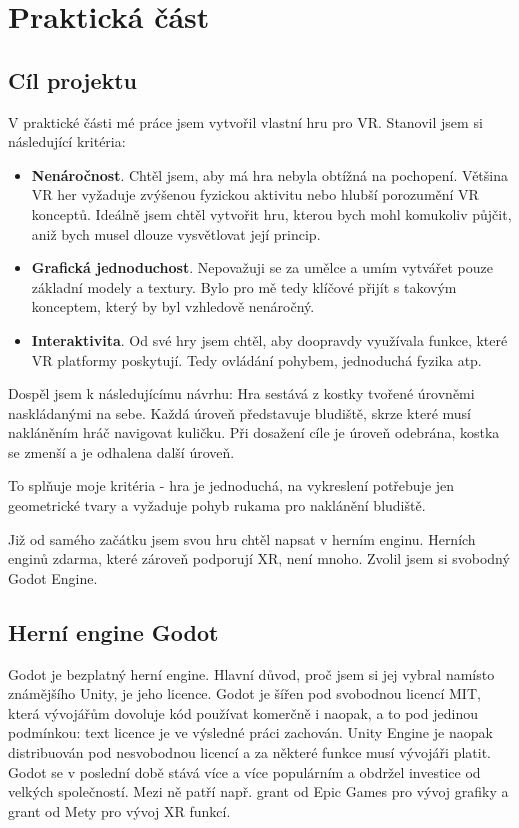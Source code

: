 \part{Praktická část}

\chapter{Cíl projektu}

V praktické části mé práce jsem vytvořil vlastní hru pro VR. Stanovil jsem si následující kritéria:

\begin{itemize}
  \item \textbf{Nenáročnost}. Chtěl jsem, aby má hra nebyla obtížná na pochopení. Většina VR her vyžaduje zvýšenou fyzickou aktivitu nebo hlubší porozumění VR konceptů. Ideálně jsem chtěl vytvořit hru, kterou bych mohl komukoliv půjčit, aniž bych musel dlouze vysvětlovat její princip.
  \item \textbf{Grafická jednoduchost}. Nepovažuji se za umělce a umím vytvářet pouze základní modely a textury. Bylo pro mě tedy klíčové přijít s takovým konceptem, který by byl vzhledově nenáročný.
  \item \textbf{Interaktivita}. Od své hry jsem chtěl, aby doopravdy využívala funkce, které VR platformy poskytují. Tedy ovládání pohybem, jednoduchá fyzika atp.
\end{itemize}

Dospěl jsem k následujícímu návrhu: Hra sestává z kostky tvořené úrovněmi naskládanými na sebe. Každá úroveň představuje bludiště, skrze které musí nakláněním hráč navigovat kuličku. Při dosažení cíle je úroveň odebrána, kostka se zmenší a je odhalena další úroveň.

To splňuje moje kritéria - hra je jednoduchá, na vykreslení potřebuje jen geometrické tvary a vyžaduje pohyb rukama pro naklánění bludiště.

Již od samého začátku jsem svou hru chtěl napsat v herním enginu. Herních enginů zdarma, které zároveň podporují XR, není mnoho. Zvolil jsem si svobodný Godot Engine.

\chapter{Herní engine Godot}

Godot je bezplatný herní engine. Hlavní důvod, proč jsem si jej vybral namísto známějšího Unity, je jeho licence. Godot je šířen pod svobodnou licencí MIT, která vývojářům dovoluje kód používat komerčně i naopak, a to pod jedinou podmínkou: text licence je ve výsledné práci zachován. Unity Engine je naopak distribuován pod nesvobodnou licencí a za některé funkce musí vývojáři platit. Godot se v poslední době stává více a více populárním a obdržel investice od velkých společností. Mezi ně patří např. grant od Epic Games pro vývoj grafiky a grant od Mety pro vývoj XR funkcí. \cite{godot_epicgames} \cite{godot_meta}


